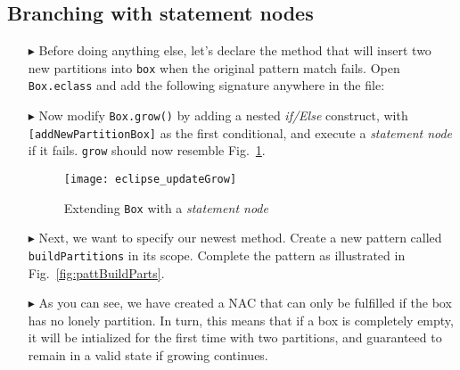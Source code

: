\newpage
\hypertarget{conBran tex}{}
\subsection{Branching with statement nodes}
\texHeader

\begin{itemize}

\item[$\blacktriangleright$] Before doing anything else, let's declare the method that will insert two new partitions into \texttt{box} when the original
pattern match fails. Open \texttt{Box.eclass} and add the following signature anywhere in the file: 

\vspace{0.5cm}

\item[$\blacktriangleright$] Now modify \texttt{Box.grow()} by adding a nested \emph{if/Else} construct, with \texttt{[addNewPartitionBox]} as the
first conditional, and execute a \emph{statement node} if it fails. \texttt{grow} should now resemble Fig.~\ref{fig:updateGrow}.

\vspace{0.5cm}

\begin{figure}[htp]
\begin{center}
  \texttt{[image: eclipse\_updateGrow]}
  \caption{Extending \texttt{Box} with a \emph{statement node}}
  \label{fig:updateGrow}
\end{center}
\end{figure}

\vspace{0.5cm}

\item[$\blacktriangleright$] Next, we want to specify our newest method. Create a new pattern called \texttt{buildPartitions} in its scope. Complete
the pattern as illustrated in Fig.~\ref{fig:pattBuildParts}.

\item[$\blacktriangleright$] As you can see, we have created a NAC that can only be fulfilled if the box has no lonely partition. In turn, this means that if a
box is completely empty, it will be intialized for the first time with two partitions, and guaranteed to remain in a valid state if growing continues.

\clearpage

\vspace*{2cm}


\end{itemize}
